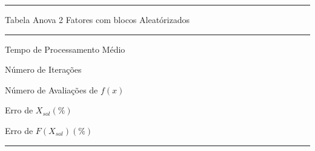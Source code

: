 \begin{minipage}[h!]{\linewidth}
    \centering
    \hrule
    \vspace{2mm}
    {Tabela Anova 2 Fatores com blocos Aleatórizados}
    \vspace{2mm}
    \noindent
    \hrule 
    \vspace{2mm}
    Tempo de Processamento Médio\\
    \label{tab:tblDa} 
    \writeanova{\tblanovaT}\par
    \bigskip
    \centering
    Número de Iterações\\
    \label{tab:tblDb} 
    \writeanova{\tblanovaNI}\par
    \bigskip
    \centering
    Número de Avaliações de $f(x)$\\
    \label{tab:tblDc} 
    \writeanova{\tblanovaNE}\par
    \bigskip
    \centering
    {Erro de $X_{sol}(\%)$}\\
    \label{tab:tblDb} 
    \writeanova{\tblanovaEX}\par
    \bigskip
    \centering
    {Erro de $F(X_{sol})(\%)$}\\
    \label{tab:tblDb} 
    \writeanova{\tblanovaEF}\par
    \vspace{2mm}
    \hrule
    \vspace{2mm}
\end{minipage}

